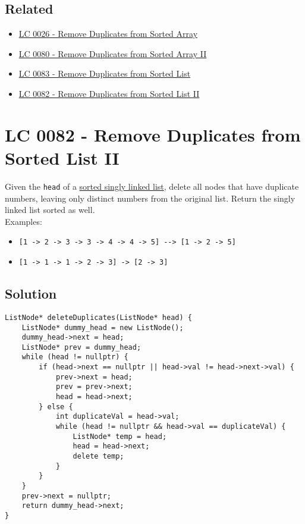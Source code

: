 \subsection*{Related}
\begin{itemize}
	\item \hyperref[lc0026]{LC 0026 - Remove Duplicates from Sorted Array}
	\item \hyperref[lc0080]{LC 0080 - Remove Duplicates from Sorted Array II}
	\item \hyperref[lc0083]{LC 0083 - Remove Duplicates from Sorted List}
	\item \hyperref[lc0082]{LC 0082 - Remove Duplicates from Sorted List II}
\end{itemize}

\section{LC 0082 - Remove Duplicates from Sorted List II}\label{lc0082}
Given the {\colorbox{CodeBackground}{\lstinline|head|}} of a \ul{sorted singly linked list}, delete all nodes that have duplicate numbers, leaving only distinct numbers from the original list. Return the singly linked list sorted as well.\\

Examples:
\begin{itemize}
\item {\colorbox{CodeBackground}{\lstinline|[1 -> 2 -> 3 -> 3 -> 4 -> 4 -> 5] --> [1 -> 2 -> 5]|}}
\item {\colorbox{CodeBackground}{\lstinline|[1 -> 1 -> 1 -> 2 -> 3] -> [2 -> 3]|}}
\end{itemize}

\subsection*{Solution}
\begin{lstlisting}
ListNode* deleteDuplicates(ListNode* head) {
	ListNode* dummy_head = new ListNode();
	dummy_head->next = head;
	ListNode* prev = dummy_head;
	while (head != nullptr) {
		if (head->next == nullptr || head->val != head->next->val) {
			prev->next = head;
			prev = prev->next;
			head = head->next;
		} else {
			int duplicateVal = head->val;
			while (head != nullptr && head->val == duplicateVal) {
				ListNode* temp = head;
				head = head->next;
				delete temp;
			}
		}
	}
	prev->next = nullptr;
	return dummy_head->next;
}
\end{lstlisting}

